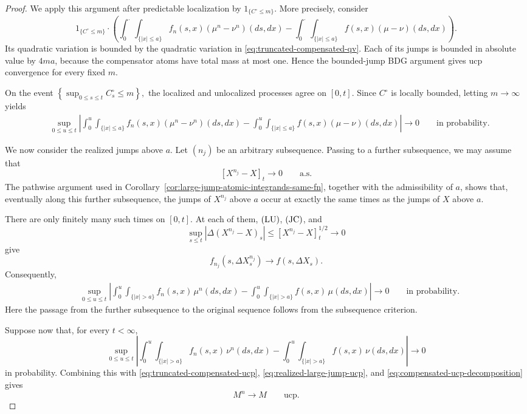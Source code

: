 \documentclass[a4paper,10pt]{article}
\begin{document}
\begin{proof}
We apply this argument after predictable localization by
\(1_{\{C^\circ\le m\}}\). More precisely, consider
\[
1_{\{C^\circ\le m\}}\cdot
\left(
\int_0^\cdot\int_{\{|x|\le a\}}
f_n(s,x)(\mu^n-\nu^n)(ds,dx)
-
\int_0^\cdot\int_{\{|x|\le a\}}
f(s,x)(\mu-\nu)(ds,dx)
\right).
\]
Its quadratic variation is bounded by the quadratic variation in
\eqref{eq:truncated-compensated-qv}. Each of its jumps is bounded in
absolute value by \(4ma\), because the compensator atoms have total
mass at most one. Hence the bounded-jump BDG argument gives ucp
convergence for every fixed \(m\).

On the event
$
        \left\{
        \sup_{0\le s\le t}C^\circ_s\le m
        \right\},
$
the localized and unlocalized processes agree on \([0,t]\).
Since \(C^\circ\) is locally bounded, letting \(m\to\infty\) yields
\begin{align}
&\sup_{0\le u\le t}
\left|
\int_0^u\int_{\{|x|\le a\}}
f_n(s,x)(\mu^n-\nu^n)(ds,dx)
-
\int_0^u\int_{\{|x|\le a\}}
f(s,x)(\mu-\nu)(ds,dx)
\right|
\longrightarrow0
\qquad\text{in probability}.
\label{eq:truncated-compensated-ucp}
\end{align}

We now consider the realized jumps above \(a\). Let \((n_j)\) be an
arbitrary subsequence. Passing to a further subsequence, we may assume
that
\[
        [X^{n_j}-X]_t\longrightarrow0
        \qquad\text{a.s.}
\]
The pathwise argument used in
Corollary~\ref{cor:large-jump-atomic-integrands-same-fn}, together with
the admissibility of \(a\), shows that, eventually along this further
subsequence, the jumps of \(X^{n_j}\) above \(a\) occur at exactly the
same times as the jumps of \(X\) above \(a\).

There are only finitely many such times on \([0,t]\). At each of them,
\({\rm (LU)}\), \({\rm (JC)}\), and
\[
        \sup_{s\le t}
        |\Delta(X^{n_j}-X)_s|
        \le
        [X^{n_j}-X]_t^{1/2}
        \longrightarrow0
\]
give
\[
        f_{n_j}(s,\Delta X^{n_j}_s)
        \longrightarrow
        f(s,\Delta X_s).
\]
Consequently,
\begin{align}
&\sup_{0\le u\le t}
\left|
\int_0^u\int_{\{|x|>a\}}
f_n(s,x)\,\mu^n(ds,dx)
-
\int_0^u\int_{\{|x|>a\}}
f(s,x)\,\mu(ds,dx)
\right|
\longrightarrow0
\qquad\text{in probability}.
\label{eq:realized-large-jump-ucp}
\end{align}
Here the passage from the further subsequence to the original
sequence follows from the subsequence criterion.

Suppose now that, for every \(t<\infty\),
\[
\sup_{0\le u\le t}
\left|
\int_0^u\int_{\{|x|>a\}}
f_n(s,x)\,\nu^n(ds,dx)
-
\int_0^u\int_{\{|x|>a\}}
f(s,x)\,\nu(ds,dx)
\right|
\longrightarrow0
\]
in probability. Combining this with
\eqref{eq:truncated-compensated-ucp},
\eqref{eq:realized-large-jump-ucp}, and
\eqref{eq:compensated-ucp-decomposition} gives
\[
        M^n\longrightarrow M
        \qquad\mathrm{ucp}.
\]


\end{proof}
\end{document}
